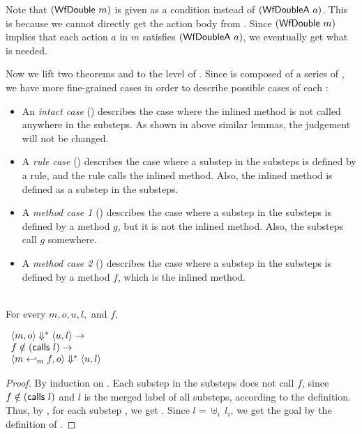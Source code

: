 Note that $(\textsf{WfDouble}\ m)$ is given as a condition instead of
$(\textsf{WfDoubleA}\ a)$. This is because we cannot directly get the action
body from \Substep{}. Since $(\textsf{WfDouble}\ m)$ implies that each action
$a$ in $m$ satisfies $(\textsf{WfDoubleA}\ a)$, we eventually get what is
needed.

Now we lift two theorems  and
 to the level of \Substeps{}. Since
\Substeps{} is composed of a series of \Substep{}, we have more
fine-grained cases in order to describe possible cases of each
\Substep{}:
\begin{itemize}
\item An \emph{intact case} () describes
  the case where the inlined method is not called anywhere in the
  substeps. As shown in above similar lemmas, the judgement will not
  be changed.
\item A \emph{rule case} () describes the
  case where a substep in the substeps is defined by a rule, and the
  rule calls the inlined method. Also, the inlined method is defined
  as a substep in the substeps.
\item A \emph{method case 1} () describes
  the case where a substep in the substeps is defined by a method $g$,
  but it is not the inlined method. Also, the substeps call $g$
  somewhere.
\item A \emph{method case 2} () describes
  the case where a substep in the substeps is defined by a method $f$,
  which is the inlined method.
\end{itemize}

\begin{lemma}
  \label{lem-inlinedmm-intact}
  \mbox{}\\
  For every $m, o, u, l,$ and $f,$
  \begin{center}
    \begin{math}
      \begin{array}{l}
        \langle m, o \rangle \Downarrow^{\ast} \langle u, l \rangle \to \\
        f \notin (\textsf{calls}\ l) \to \\
        \langle m \hookleftarrow_{m}{} f, o \rangle \Downarrow^{\ast} \langle u, l \rangle
      \end{array}
    \end{math}
  \end{center}
\end{lemma}
\begin{proof}
  By induction on \Substeps{}. Each substep in the substeps does not
  call $f$, since $f \notin (\textsf{calls}\ l)$ and $l$ is the merged label
  of all substeps, according to the definition. Thus, by
  , for each substep
  , we get
  . Since $l = \uplus_i\ l_i$,
  we get the goal by the definition of \Substeps{}.
\end{proof}

